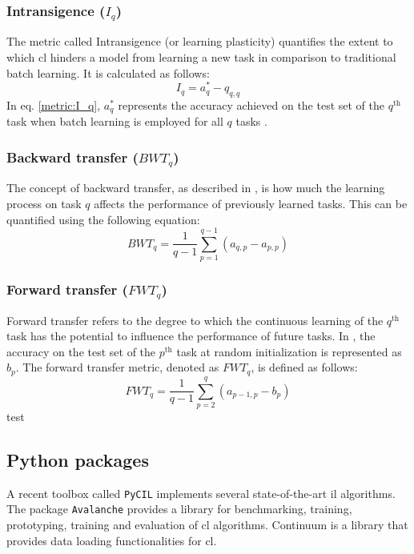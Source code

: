 \subsubsection{Intransigence ($I_{q}$)}
The metric called Intransigence (or learning plasticity) quantifies the extent to which \acrshort{cl} hinders a model from learning a new task in comparison to traditional batch learning. It is calculated as follows: 
\begin{equation}
\label{metric:I_q}
    I_{q} = a^{*}_{q} - q_{q,q}
\end{equation} 
In eq. \ref{metric:I_q}, $a^{*}_{q}$ represents the accuracy achieved on the test set of the $q^{\text{th}}$ task when batch learning is employed for all $q$ tasks \citep{chaudhry2018riemannian}.

\subsubsection{Backward transfer ($BWT_{q}$)}
The concept of backward transfer, as described in \citep{lopez2017gradient}, is how much the learning process on task $q$ affects the performance of previously learned tasks. This can be quantified using the following equation: \begin{equation}
\label{metric:BWT_q}
BWT_{q} = \frac{1}{q-1} \sum_{p=1}^{q-1} (a_{q,p} - a_{p,p})
\end{equation}

\subsubsection{Forward transfer ($FWT_{q}$)}
Forward transfer refers to the degree to which the continuous learning of the $q^{\text{th}}$ task has the potential to influence the performance of future tasks. In \citep{lopez2017gradient}, the accuracy on the test set of the $p^{\text{th}}$ task at random initialization is represented as $b_{p}$. The forward transfer metric, denoted as $FWT_{q}$, is defined as follows: \begin{equation} FWT_{q} = \frac{1}{q-1} \sum_{p=2}^{q} (a_{p-1,p} - b_{p}) \end{equation}
\citep{wang2023comprehensive}test

\subsection{Python packages}
A recent toolbox called \verb|PyCIL| \citep{zhou2023class, zhou2023pycil} implements several state-of-the-art \acrshort{il} algorithms. The package \verb|Avalanche| \citep{lomonaco2021avalanche} provides a library for benchmarking, training, prototyping, training and evaluation of \acrshort{cl} algorithms. Continuum \citep{douillardlesort2021continuum} is a library that provides data loading functionalities for \acrshort{cl}. 

